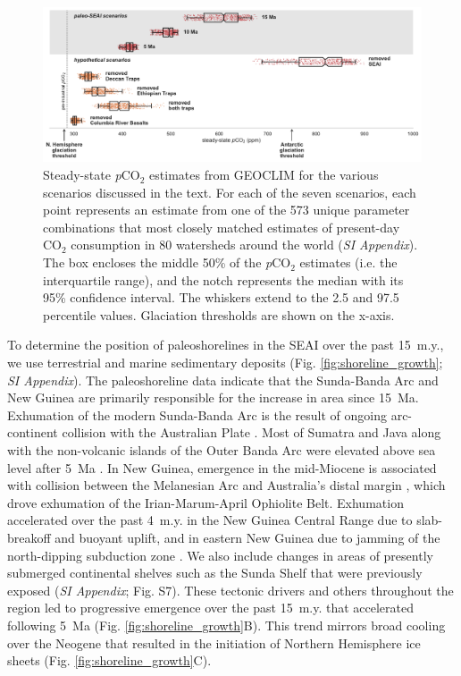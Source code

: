 \documentclass[9pt,twocolumn,twoside,lineno]{pnas-new}
\newcommand{\pCOtwo}{\textit{p}CO$_{2}$\xspace}
\newcommand{\COtwo}{CO$_{2}$\xspace}
\newcommand{\SI}{\textit{SI Appendix}\xspace}
\begin{document}
\begin{figure}[h]
    \centering
    \includegraphics[width=1\linewidth]{Figures/scenario_pCO2.pdf}
    \caption{Steady-state \pCOtwo estimates from GEOCLIM for the various scenarios discussed in the text. For each of the seven scenarios, each point represents an estimate from one of the 573 unique parameter combinations that most closely matched estimates of present-day \COtwo consumption in 80 watersheds around the world (\SI). The box encloses the middle 50\% of the \pCOtwo estimates (i.e. the interquartile range), and the notch represents the median with its 95\% confidence interval. The whiskers extend to the 2.5 and 97.5 percentile values. Glaciation thresholds \cite{DeConto2008a} are shown on the x-axis.}
    \label{fig:scenario_pCO2}
\end{figure}

To determine the position of paleoshorelines in the SEAI over the past 15~m.y., we use terrestrial and marine sedimentary deposits (Fig. \ref{fig:shoreline_growth}; \SI). The paleoshoreline data indicate that the Sunda-Banda Arc and New Guinea are primarily responsible for the increase in area since 15~Ma. Exhumation of the modern Sunda-Banda Arc is the result of ongoing arc-continent collision with the Australian Plate \cite{Harris2006a}. Most of Sumatra and Java along with the non-volcanic islands of the Outer Banda Arc were elevated above sea level after 5~Ma \cite{Hall2013b}. In New Guinea, emergence in the mid-Miocene is associated with collision between the Melanesian Arc and Australia's distal margin \cite{Cloos2005a}, which drove exhumation of the Irian-Marum-April Ophiolite Belt. Exhumation accelerated over the past 4~m.y. in the New Guinea Central Range due to slab-breakoff and buoyant uplift, and in eastern New Guinea due to jamming of the north-dipping subduction zone \cite{Cloos2005a}. We also include changes in areas of presently submerged continental shelves such as the Sunda Shelf that were previously exposed (\SI; Fig. S7). These tectonic drivers and others throughout the region led to progressive emergence over the past 15~m.y. that accelerated following 5~Ma (Fig. \ref{fig:shoreline_growth}B). This trend mirrors broad cooling over the Neogene that resulted in the initiation of Northern Hemisphere ice sheets (Fig. \ref{fig:shoreline_growth}C).
\end{document}
